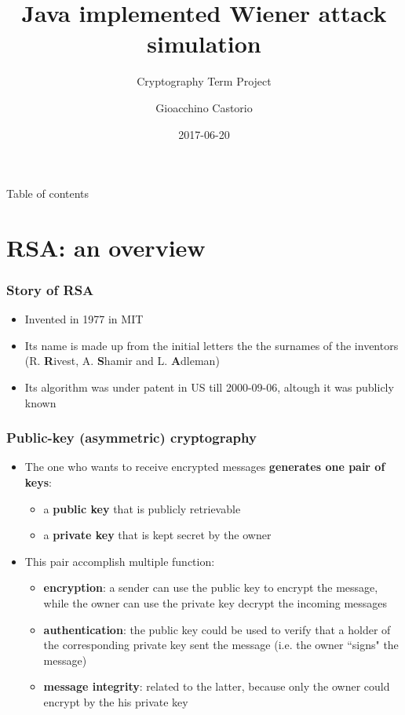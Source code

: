 \documentclass{beamer}
\title{Java implemented Wiener attack simulation}
\subtitle{Cryptography Term Project}
\author{Gioacchino Castorio}
\institute{Università dell'Aquila}
\date{2017-06-20}
\begin{document}
\frame{\titlepage}

\begin{frame}{Table of contents}
\tableofcontents
\end{frame}

\section{RSA: an overview}

\frame{\sectionpage}


	\begin{frame}
    \frametitle{Story of RSA}
    \begin{itemize}
     	\item Invented in 1977 in MIT
     	\item Its name is made up from the initial letters the the surnames of the inventors (R. \textbf{R}ivest, A. \textbf{S}hamir and L. \textbf{A}dleman)
     	\item Its algorithm was under patent in US till 2000-09-06, altough it was publicly known
    \end{itemize}
  \end{frame}
  
  
  \begin{frame}
    \frametitle{Public-key (asymmetric) cryptography}
    \begin{itemize}
    		\item The one who wants to receive encrypted messages \textbf{generates one pair of keys}: 
    		\begin{itemize}
    			\item a \textbf{public key} that is publicly retrievable
    			\item a \textbf{private key} that is kept secret by the owner
    		\end{itemize} 	 
    		\item This pair accomplish multiple function:
    		\begin{itemize}
    			\item \textbf{encryption}: a sender can use the public key to encrypt the message, while the owner can use the private key decrypt the incoming messages
    			\item \textbf{authentication}: the public key could be used to verify that a holder of the corresponding private key sent the message (i.e. the owner ``signs" the message)
    			\item \textbf{message integrity}: related to the latter, because only the owner could encrypt by the his private key
    		\end{itemize}
    \end{itemize}
  \end{frame}
  
\end{document}

